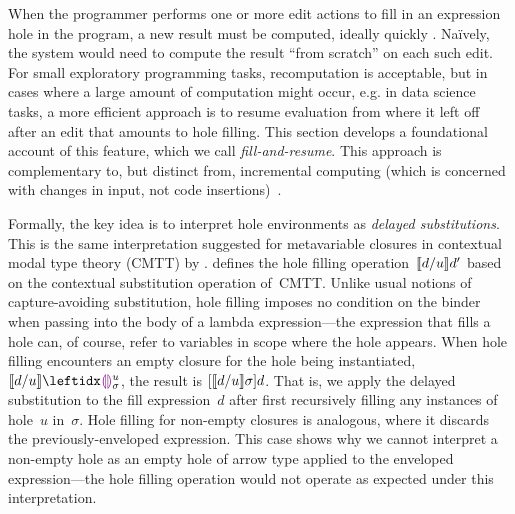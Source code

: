 When the programmer performs one or more edit actions to fill in an expression hole in the program, a new result must be computed, ideally quickly \cite{DBLP:conf/icse/Tanimoto13,DBLP:journals/vlc/Tanimoto90}. Na\"ively, the system would need to compute the result ``from scratch'' on each such edit. For small exploratory programming tasks, recomputation is acceptable, but in cases where a large amount of computation might occur, e.g. in data science tasks, a more efficient approach is to resume evaluation from where it left off after an edit that amounts to hole filling. This section develops a foundational account of this feature, which we call \emph{fill-and-resume}. This approach is complementary to, but distinct from, incremental computing (which is concerned with changes in input, not code insertions)~\cite{Hammer2014}.

Formally,
%
the key idea is to interpret hole environments as \emph{delayed substitutions}. This is the same interpretation suggested for metavariable closures in contextual modal
type theory (CMTT) by \citet{Nanevski2008}.
%
%
 defines the hole filling operation~$\llbracket d / u\rrbracket d'$
based on the contextual substitution operation of~CMTT.
%
Unlike usual notions of capture-avoiding substitution,
hole filling imposes no condition on the binder when passing into the
body of a lambda expression---the expression that fills a hole can, of
course, refer to variables in scope where the hole appears.
%
When hole filling encounters an empty closure for the hole being
instantiated, $\instantiate{d}{u}{\dehole{u}{\sigma}{}}$, the result
is $[\llbracket d / u\rrbracket \sigma]d$.
%
That is, we apply the delayed substitution to the fill expression~$d$
after first recursively filling any instances of hole~$u$ in~$\sigma$.
%
Hole filling for non-empty closures is analogous, where it discards
the previously-enveloped expression.
%
%
%
This case shows why we cannot interpret a non-empty hole as an empty
hole of arrow type applied to the enveloped expression---the hole
filling operation would not operate as expected under this
interpretation.



